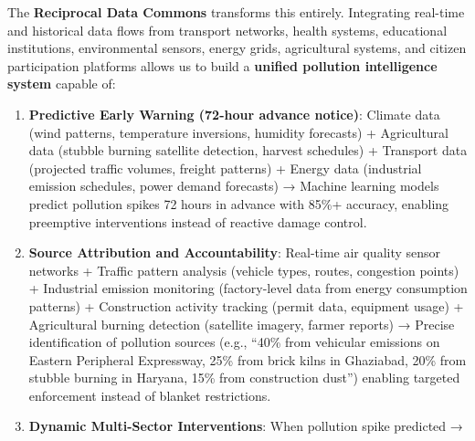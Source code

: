 The \textbf{Reciprocal Data Commons} transforms this entirely.
Integrating real-time and historical data flows from transport networks,
health systems, educational institutions, environmental sensors, energy
grids, agricultural systems, and citizen participation platforms allows
us to build a \textbf{unified pollution intelligence system} capable of:

\begin{enumerate}
\def\labelenumi{\arabic{enumi}.}
\item
  \textbf{Predictive Early Warning (72-hour advance notice)}: Climate
  data (wind patterns, temperature inversions, humidity forecasts) +
  Agricultural data (stubble burning satellite detection, harvest
  schedules) + Transport data (projected traffic volumes, freight
  patterns) + Energy data (industrial emission schedules, power demand
  forecasts) → Machine learning models predict pollution spikes 72 hours
  in advance with 85\%+ accuracy, enabling preemptive interventions
  instead of reactive damage control.
\item
  \textbf{Source Attribution and Accountability}: Real-time air quality
  sensor networks + Traffic pattern analysis (vehicle types, routes,
  congestion points) + Industrial emission monitoring (factory-level
  data from energy consumption patterns) + Construction activity
  tracking (permit data, equipment usage) + Agricultural burning
  detection (satellite imagery, farmer reports) → Precise identification
  of pollution sources (e.g., ``40\% from vehicular emissions on Eastern
  Peripheral Expressway, 25\% from brick kilns in Ghaziabad, 20\% from
  stubble burning in Haryana, 15\% from construction dust'') enabling
  targeted enforcement instead of blanket restrictions.
\item
  \textbf{Dynamic Multi-Sector Interventions}: When pollution spike
  predicted →


\end{enumerate}
